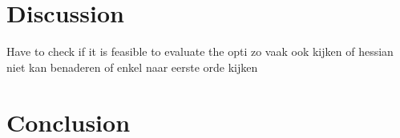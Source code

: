 
\section{Discussion} \label{s:discussion_enh}
Have to check if it is feasible to evaluate the opti zo vaak
ook kijken of hessian niet kan benaderen
of enkel naar eerste orde kijken
\section{Conclusion}\label{s:conclusion_enh}

%		






















